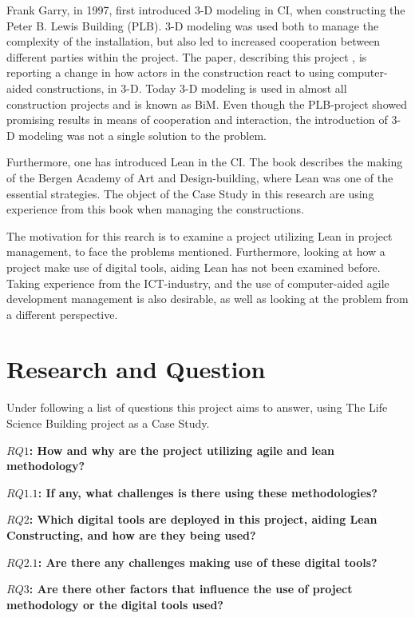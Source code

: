 Frank Garry, in 1997, first introduced 3-D modeling in CI, when constructing the Peter B. Lewis Building (PLB). 3-D modeling was used both to manage the complexity of the installation, but also led to increased cooperation between different parties within the project. The paper, describing this project \cite{frank_gehry}, is reporting a change in how actors in the construction react to using computer-aided constructions, in 3-D. Today 3-D modeling is used in almost all construction projects and is known as BiM. Even though the PLB-project showed promising results in means of cooperation and interaction, the introduction of 3-D modeling was not a single solution to the problem.

Furthermore, one has introduced Lean in the CI. The book \cite{lean_i_praksis} describes the making of the Bergen Academy of Art and Design-building, where Lean was one of the essential strategies. The object of the Case Study in this research are using experience from this book when managing the constructions. 

The motivation for this rearch is to examine a project utilizing Lean in project management, to face the problems mentioned. Furthermore, looking at how a project make use of digital tools, aiding Lean has not been examined before. Taking experience from the ICT-industry, and the use of computer-aided agile development management is also desirable, as well as looking at the problem from a different perspective.

\section{Research and Question} \label{sec:research}
Under following a list of questions this project aims to answer, using The Life Science Building project as a Case Study.

{\noindent \bf $RQ1$: How and why are the project utilizing agile and lean methodology?}

{\indent \bf $RQ1.1$: If any, what challenges is there using these methodologies?}

{\noindent \bf $RQ2$: Which digital tools are deployed in this project, aiding Lean Constructing, and how are they being used?}

{\indent \bf $RQ2.1$: Are there any challenges making use of these digital tools?}

{\noindent \bf $RQ3$: Are there other factors that influence the use of project methodology or the digital tools used?}

